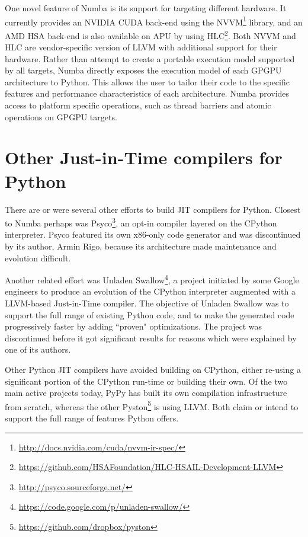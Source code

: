 \documentclass{acm_proc_article-sp}
\begin{document}
One novel feature of Numba is its support for targeting different
hardware.  It currently provides an NVIDIA CUDA\cite{CUDA} back-end using the
NVVM\footnote{\url{http://docs.nvidia.com/cuda/nvvm-ir-spec/}}
library, and an AMD HSA\cite{HSA} back-end is also available on APU by using
HLC\footnote{\url{https://github.com/HSAFoundation/HLC-HSAIL-Development-LLVM}}.
Both NVVM and HLC are vendor-specific version of LLVM with additional
support for their hardware.  Rather than attempt to create a portable
execution model supported by all targets, Numba directly exposes the
execution model of each GPGPU architecture to Python.  This allows the
user to tailor their code to the specific features and performance
characteristics of each architecture.  Numba provides access to
platform specific operations, such as thread barriers and atomic
operations on GPGPU targets.

\section{Other Just-in-Time compilers for Python}

There are or were several other efforts to build JIT compilers for
Python.  Closest to Numba perhaps was
Psyco\footnote{\url{http://psyco.sourceforge.net/}}, an opt-in
compiler layered on the CPython interpreter.  Psyco featured its own
x86-only code generator and was discontinued by its author, Armin
Rigo, because its architecture made maintenance and evolution
difficult. \cite{rigo2004representation}

Another related effort was
Unladen Swallow\footnote{\url{https://code.google.com/p/unladen-swallow/}},
a project initiated by some
Google engineers to produce an evolution of the CPython interpreter augmented
with a LLVM-based Just-in-Time compiler.
The objective of Unladen Swallow was to support the full range of existing
Python code, and to make the generated code progressively faster by adding
``proven" optimizations.  The project was discontinued before it got
significant results for reasons which were explained by one of its authors.
\cite{kleckner:unladen_swallow_post_mortem}

Other Python JIT compilers have avoided building on CPython, either
re-using a significant portion of the CPython run-time or building
their own.  Of the two main active projects today, PyPy
\cite{pypy:pypy} has built its own compilation infrastructure from
scratch, whereas the other
Pyston\footnote{\url{https://github.com/dropbox/pyston}} is using
LLVM.  Both claim or intend to support the full range of features
Python offers.
\end{document}
